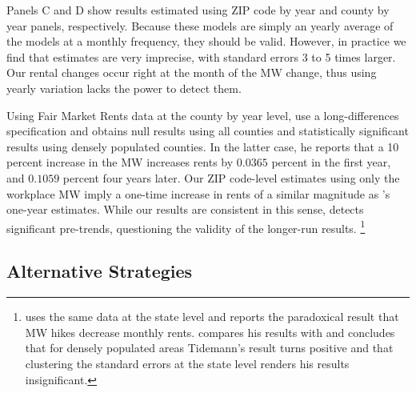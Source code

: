 Panels C and D show results estimated using ZIP code by year and county by
year panels, respectively.
Because these models are simply an yearly average of the models at a 
monthly frequency, they should be valid.
However, in practice we find that estimates are very imprecise, with standard
errors 3 to 5 times larger.
Our rental changes occur right at the month of the MW change, thus using 
yearly variation lacks the power to detect them.

%

Using Fair Market Rents data at the county by year level, 
\textcite[][, Tables 1 and 2]{Yamagishi2019} use a long-differences 
specification and obtains null results using all counties and statistically 
significant results using densely populated counties.
In the latter case, he reports that a 10 percent increase in the MW increases
rents by $0.0365$ percent in the first year, and $0.1059$ percent four years 
later.
Our ZIP code-level estimates using only the workplace MW imply a one-time 
increase in rents of a similar magnitude as \citeauthor{Yamagishi2019}'s 
\textcite[][Table 2, Column 1]{Yamagishi2019} one-year estimates.
While our results are consistent in this sense, 
\parencite[][table 3]{Yamagishi2019} detects significant pre-trends,
questioning the validity of the longer-run results.%
\footnote{\textcite{Tidemann2018} uses the same data at the state level and 
reports the paradoxical result that MW hikes decrease monthly rents.
\textcite[][, Appendix C.1.3.]{Yamagishi2019} compares his results with 
\textcite{Tidemann2018} and concludes that for densely populated areas 
Tidemann's result turns positive and that clustering the standard errors at the
state level renders his results insignificant.}

\subsection{Alternative Strategies}
\label{sec:results_alternative_strategies}

